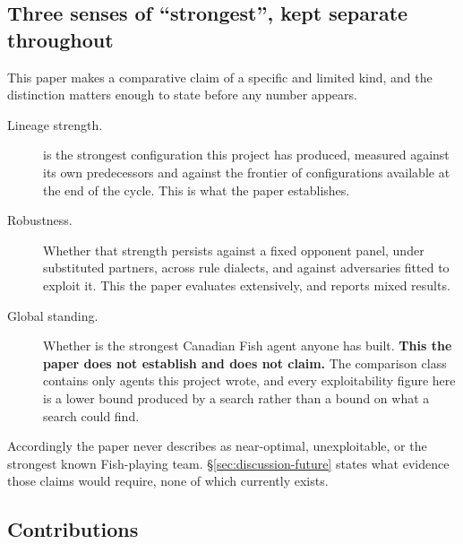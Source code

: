 \subsection{Three senses of ``strongest'', kept separate throughout}
\label{sec:intro-strength}

This paper makes a comparative claim of a specific and limited kind, and the distinction matters
enough to state before any number appears.

\begin{description}
\item[Lineage strength.] \sestina{} is the strongest configuration this project has produced,
  measured against its own predecessors and against the frontier of configurations available at the
  end of the \vsix{} cycle. This is what the paper establishes.
\item[Robustness.] Whether that strength persists against a fixed opponent panel, under substituted
  partners, across rule dialects, and against adversaries fitted to exploit it. This the paper
  evaluates extensively, and reports mixed results.
\item[Global standing.] Whether \sestina{} is the strongest Canadian Fish agent anyone has built.
  \textbf{This the paper does not establish and does not claim.} The comparison class contains only
  agents this project wrote, and every exploitability figure here is a lower bound produced by a
  search rather than a bound on what a search could find.
\end{description}

Accordingly the paper never describes \sestina{} as near-optimal, unexploitable, or the strongest
known Fish-playing team. \S\ref{sec:discussion-future} states what evidence those claims would
require, none of which currently exists.

\subsection{Contributions}
\label{sec:intro-contributions}

